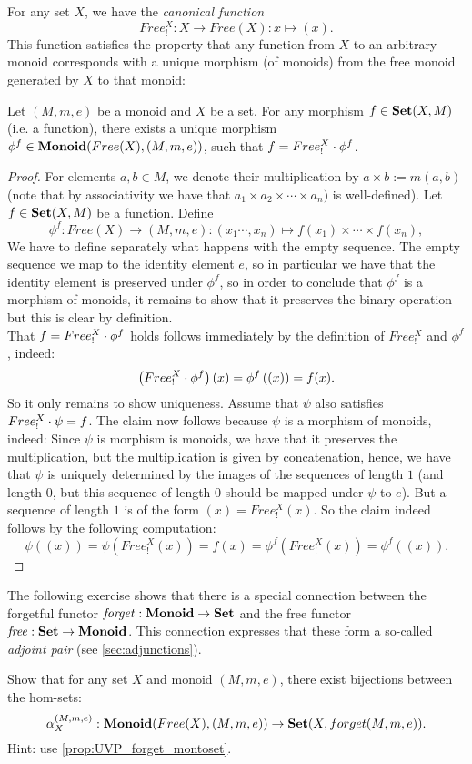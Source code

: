 For any set $X$, we have the \textit{canonical function} 
\[
Free^{X}_{!}: X\to Free(X): x\mapsto (x).
\]
This function satisfies the property that any function from $X$ to an arbitrary monoid corresponds with a unique morphism (of monoids) from the free monoid generated by $X$ to that monoid:
\begin{prop}\label{prop:UVP_forget_montoset} Let $(M,m,e)$ be a monoid and $X$ be a set. For any morphism $f \in {\mathbf{Set}}(X,M)$ (i.e. a function), there exists a unique  morphism $\phi^{f} \in {\mathbf{Monoid}}(Free(X),(M,m,e))$, such that $f = Free^{X}_{!}\cdot \phi^{f}$.
\begin{proof}
For elements $a,b\in M$, we denote their multiplication by $a\times b := m(a,b)$ (note that by associativity we have that $a_1\times a_2\times\cdots\times a_n)$ is well-defined). Let $f\in {\mathbf{Set}}(X,M)$ be a function. Define 
\[
\phi^{f}: Free(X)\to (M,m,e): (x_1\cdots,x_n)\mapsto f(x_1) \times\cdots \times f(x_n),
\] 
We have to define separately what happens with the empty sequence. The empty sequence we map to the identity element $e$, so in particular we have that the identity element is preserved under $\phi^{f}$, so in order to conclude that $\phi^{f}$ is a morphism of monoids, it remains to show that it preserves the binary operation but this is clear by definition.\\
That $f = Free^{X}_{!}\cdot \phi^{f}$ holds follows immediately by the definition of $Free^{X}_{!}$ and $\phi^{f}$, indeed:
\[
\left(Free^{X}_{!}\cdot \phi^{f}\right)(x) = \phi^{f}\left((x)\right) = f(x).
\]
So it only remains to show uniqueness. Assume that $\psi$ also satisfies $Free^{X}_{!}\cdot \psi = f$. The claim now follows because $\psi$ is a morphism of monoids, indeed: Since $\psi$ is morphism is monoids, we have that it preserves the multiplication, but the multiplication is given by concatenation, hence, we have that $\psi$ is uniquely determined by the images of the sequences of length $1$ (and length $0$, but this sequence of length $0$ should be mapped under $\psi$ to $e$). But a sequence of length $1$ is of the form $(x) = Free^{X}_{!}(x)$. So the claim indeed follows by the following computation: 
\[
\psi((x)) = \psi(Free^{X}_{!}(x)) = f(x) = \phi^{f}(Free^{X}_{!}(x)) = \phi^{f}((x)).
\]
\end{proof}
\end{prop}

The following exercise shows that there is a special connection between the forgetful functor $\mathit{forget}: \mathbf{Monoid}\to\mathbf{Set}$ and the free functor $\mathit{free}: \mathbf{Set}\to\mathbf{Monoid}$. This connection expresses that these form a so-called \textit{adjoint pair} (see \cref{sec:adjunctions}).
\begin{exer}\label{exer:preadjunction_monset}
Show that for any set $X$ and monoid $(M,m,e)$, there exist bijections between the hom-sets:
\[
\alpha_{X}^{(M,m,e)} : {\mathbf{Monoid}}(Free(X),(M,m,e)) \to {\mathbf{Set}}(X,forget(M,m,e)).
\]
Hint: use \cref{prop:UVP_forget_montoset}.
\end{exer}

